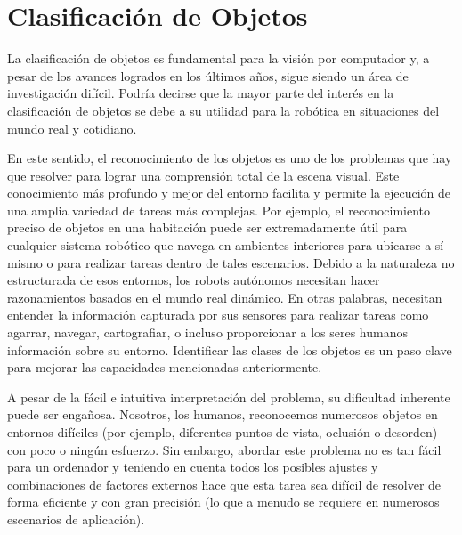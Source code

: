 \chapter{Clasificación de Objetos}

La clasificación de objetos es fundamental para la visión por computador y, a pesar de los avances logrados en los últimos años, sigue siendo un área de investigación difícil. Podría decirse que la mayor parte del interés en la clasificación de objetos se debe a su utilidad para la robótica en situaciones del mundo real y cotidiano.

En este sentido, el reconocimiento de los objetos es uno de los problemas que hay que resolver para lograr una comprensión total de la escena visual. Este conocimiento más profundo y mejor del entorno facilita y permite la ejecución de una amplia variedad de tareas más complejas. Por ejemplo, el reconocimiento preciso de objetos en una habitación puede ser extremadamente útil para cualquier sistema robótico que navega en ambientes interiores para ubicarse a sí mismo o para realizar tareas dentro de tales escenarios. Debido a la naturaleza no estructurada de esos entornos, los robots autónomos necesitan hacer razonamientos basados en el mundo real dinámico. En otras palabras, necesitan entender la información capturada por sus sensores para realizar tareas como agarrar, navegar, cartografiar, o incluso proporcionar a los seres humanos información sobre su entorno. Identificar las clases de los objetos es un paso clave para mejorar las capacidades mencionadas anteriormente.

A pesar de la fácil e intuitiva interpretación del problema, su dificultad inherente puede ser engañosa. Nosotros, los humanos, reconocemos numerosos objetos en entornos difíciles (por ejemplo, diferentes puntos de vista, oclusión o desorden) con poco o ningún esfuerzo. Sin embargo, abordar este problema no es tan fácil para un ordenador y teniendo en cuenta todos los posibles ajustes y combinaciones de factores externos hace que esta tarea sea difícil de resolver de forma eficiente y con gran precisión (lo que a menudo se requiere en numerosos escenarios de aplicación).


